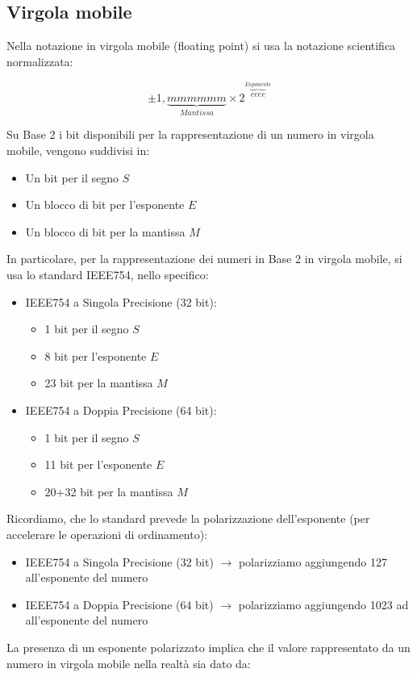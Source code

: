 \documentclass{article}
\begin{document}
\subsection{Virgola mobile}
Nella notazione in virgola mobile (floating point) si usa la notazione scientifica normalizzata:

$$\pm 1,\underset{Mantissa}{\underbrace{mmmmmm}}\times 2^{\overset{Esponente}{\overbrace{eeee}}}$$

Su Base 2 i bit disponibili per la rappresentazione di un numero in virgola mobile, vengono suddivisi in:
\begin{itemize}
    \item Un bit per il segno $S$
    \item Un blocco di bit per l'esponente $E$
    \item Un blocco di bit per la mantissa $M$
\end{itemize}
In particolare, per la rappresentazione dei numeri in Base 2 in virgola mobile, si usa lo standard IEEE754, nello specifico:
\begin{itemize}
    \item IEEE754 a Singola Precisione (32 bit):
    \begin{itemize}
        \item 1 bit per il segno $S$
        \item 8 bit per l'esponente $E$
        \item 23 bit per la mantissa $M$
    \end{itemize}
    \item IEEE754 a Doppia Precisione (64 bit):
    \begin{itemize}
        \item 1 bit per il segno $S$
        \item 11 bit per l'esponente $E$
        \item 20+32 bit per la mantissa $M$
    \end{itemize}
     
\end{itemize}

Ricordiamo, che lo standard prevede la polarizzazione dell'esponente (per accelerare le operazioni di ordinamento):
\begin{itemize}
    \item IEEE754 a Singola Precisione (32 bit) $\rightarrow$ polarizziamo aggiungendo 127 all'esponente del numero
    \item IEEE754 a Doppia Precisione (64 bit) $\rightarrow$ polarizziamo aggiungendo 1023 ad all'esponente del numero
\end{itemize}
La presenza di un esponente polarizzato implica che il valore rappresentato da un numero in virgola mobile nella realtà sia dato da:
\end{document}
